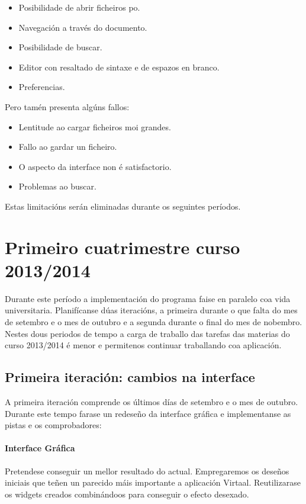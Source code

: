 \begin{itemize}
  \item Posibilidade de abrir ficheiros po.
  \item Navegación a través do documento.
  \item Posibilidade de buscar.
  \item Editor con resaltado de sintaxe e de espazos en branco.
  \item Preferencias.
\end{itemize}

Pero tamén presenta algúns fallos:

\begin{itemize}
  \item Lentitude ao cargar ficheiros moi grandes.
  \item Fallo ao gardar un ficheiro.
  \item O aspecto da interface non é satisfactorio.
  \item Problemas ao buscar.
\end{itemize}

Estas limitacións serán eliminadas durante os seguintes períodos.


\section{Primeiro cuatrimestre curso 2013/2014}

Durante este período a implementación do programa faise en paralelo coa vida universitaria. Planifícanse dúas iteracións, a primeira durante o que falta do mes de setembro e o mes de outubro e a segunda durante o final do mes de nobembro. Nestes dous periodos de tempo a carga de traballo das tarefas das materias do curso 2013/2014 é menor e permitenos continuar traballando coa aplicación.

\subsection{Primeira iteración: cambios na interface}
A primeira iteración comprende os últimos días de setembro e o mes de outubro. Durante este tempo farase un redeseño da interface gráfica e implementanse as pistas e os comprobadores:

\paragraph{Interface Gráfica} Pretendese conseguir un mellor resultado do actual. Empregaremos os deseños iniciais que teñen un parecido máis importante a aplicación Virtaal. Reutilizarase os widgets creados combinándoos para conseguir o efecto desexado.


